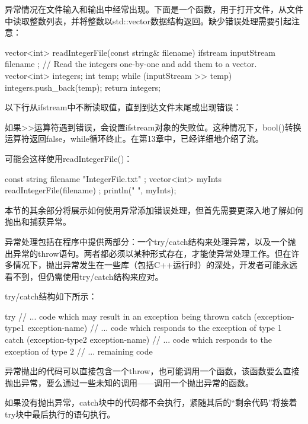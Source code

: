 
异常情况在文件输入和输出中经常出现。下面是一个函数，用于打开文件，从文件中读取整数列表，并将整数以std::vector数据结构返回。缺少错误处理需要引起注意：

\begin{cpp}
vector<int> readIntegerFile(const string& filename)
{
    ifstream inputStream { filename };
    // Read the integers one-by-one and add them to a vector.
    vector<int> integers;
    int temp;
    while (inputStream >> temp) {
        integers.push_back(temp);
    }
    return integers;
}
\end{cpp}

以下行从ifstream中不断读取值，直到到达文件末尾或出现错误：

\begin{cpp}
while (inputStream >> temp) {
\end{cpp}

如果>{}>运算符遇到错误，会设置ifstream对象的失败位。这种情况下，bool()转换运算符返回false，while循环终止。在第13章中，已经详细地介绍了流。

可能会这样使用readIntegerFile()：

\begin{cpp}
const string filename { "IntegerFile.txt" };
vector<int> myInts { readIntegerFile(filename) };
println("{} ", myInts);
\end{cpp}

本节的其余部分将展示如何使用异常添加错误处理，但首先需要更深入地了解如何抛出和捕获异常。


异常处理包括在程序中提供两部分：一个try/catch结构来处理异常，以及一个抛出异常的throw语句。两者都必须以某种形式存在，才能使异常处理工作。但在许多情况下，抛出异常发生在一些库（包括C++运行时）的深处，开发者可能永远看不到，但仍需使用try/catch结构来应对。

try/catch结构如下所示：

\begin{cpp}
try {
    // ... code which may result in an exception being thrown
} catch (exception-type1 exception-name) {
    // ... code which responds to the exception of type 1
} catch (exception-type2 exception-name) {
    // ... code which responds to the exception of type 2
}
// ... remaining code
\end{cpp}

异常抛出的代码可以直接包含一个throw，也可能调用一个函数，该函数要么直接抛出异常，要么通过一些未知的调用——调用一个抛出异常的函数。

如果没有抛出异常，catch块中的代码都不会执行，紧随其后的“剩余代码”将接着try块中最后执行的语句执行。

